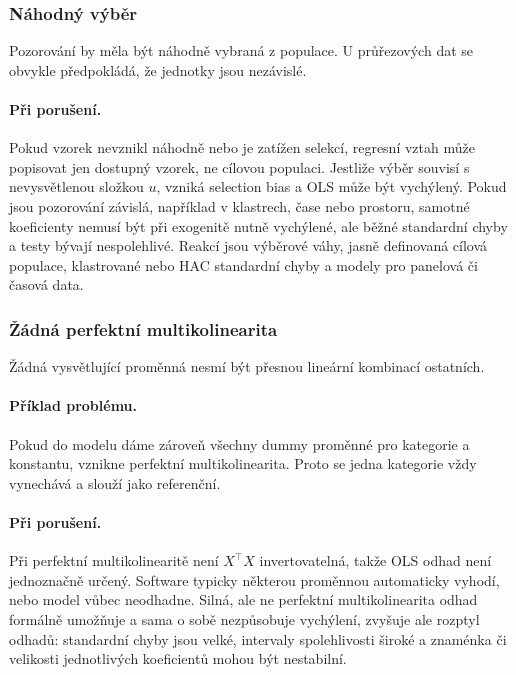 \subsubsection{Náhodný výběr}

Pozorování by měla být náhodně vybraná z populace. U průřezových dat se obvykle předpokládá, že jednotky
jsou nezávislé.

\paragraph{Při porušení.}
Pokud vzorek nevznikl náhodně nebo je zatížen selekcí, regresní vztah může popisovat jen dostupný vzorek,
ne cílovou populaci. Jestliže výběr souvisí s nevysvětlenou složkou \(u\), vzniká selection bias a OLS
může být vychýlený. Pokud jsou pozorování závislá, například v klastrech, čase nebo prostoru, samotné
koeficienty nemusí být při exogenitě nutně vychýlené, ale běžné standardní chyby a testy bývají
nespolehlivé. Reakcí jsou výběrové váhy, jasně definovaná cílová populace, klastrované nebo HAC
standardní chyby a modely pro panelová či časová data.

\subsubsection{Žádná perfektní multikolinearita}

Žádná vysvětlující proměnná nesmí být přesnou lineární kombinací ostatních.

\paragraph{Příklad problému.}
Pokud do modelu dáme zároveň všechny dummy proměnné pro kategorie a konstantu, vznikne perfektní
multikolinearita. Proto se jedna kategorie vždy vynechává a slouží jako referenční.

\paragraph{Při porušení.}
Při perfektní multikolinearitě není \(X^\top X\) invertovatelná, takže OLS odhad není jednoznačně
určený. Software typicky některou proměnnou automaticky vyhodí, nebo model vůbec neodhadne. Silná, ale
ne perfektní multikolinearita odhad formálně umožňuje a sama o sobě nezpůsobuje vychýlení, zvyšuje ale
rozptyl odhadů: standardní chyby jsou velké, intervaly spolehlivosti široké a znaménka či velikosti
jednotlivých koeficientů mohou být nestabilní.

